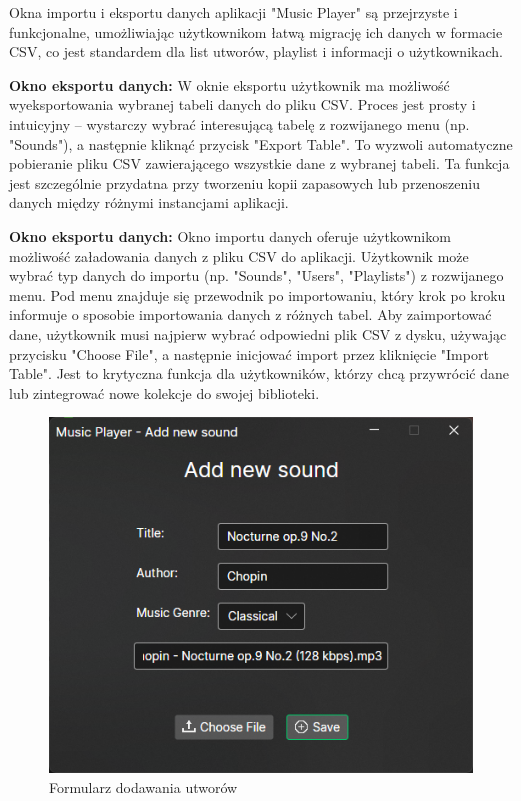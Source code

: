 {
Okna importu i eksportu danych aplikacji "Music Player" są przejrzyste i funkcjonalne, umożliwiając użytkownikom łatwą migrację ich danych w formacie CSV, co jest standardem dla list utworów, playlist i informacji o użytkownikach.


\textbf{Okno eksportu danych:}
W oknie eksportu użytkownik ma możliwość wyeksportowania wybranej tabeli danych do pliku CSV. Proces jest prosty i intuicyjny – wystarczy wybrać interesującą tabelę z rozwijanego menu (np. "Sounds"), a następnie kliknąć przycisk "Export Table". To wyzwoli automatyczne pobieranie pliku CSV zawierającego wszystkie dane z wybranej tabeli. Ta funkcja jest szczególnie przydatna przy tworzeniu kopii zapasowych lub przenoszeniu danych między różnymi instancjami aplikacji.

\textbf{Okno eksportu danych:}
Okno importu danych oferuje użytkownikom możliwość załadowania danych z pliku CSV do aplikacji. Użytkownik może wybrać typ danych do importu (np. "Sounds", "Users", "Playlists") z rozwijanego menu. Pod menu znajduje się przewodnik po importowaniu, który krok po kroku informuje o sposobie importowania danych z różnych tabel. Aby zaimportować dane, użytkownik musi najpierw wybrać odpowiedni plik CSV z dysku, używając przycisku "Choose File", a następnie inicjować import przez kliknięcie "Import Table". Jest to krytyczna funkcja dla użytkowników, którzy chcą przywrócić dane lub zintegrować nowe kolekcje do swojej biblioteki.
}

\newpage

\begin{figure}[!ht]
	\begin{center}
	\includegraphics[]{figures/add_new_sound.png}
        \caption{{\footnotesize Formularz dodawania utworów}}
	\end{center}
\end{figure}

